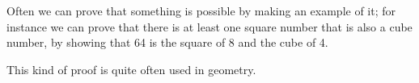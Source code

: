 Often we can prove that something is possible by making an example of it;
for instance we can prove that there is at least one square number that is 
also a cube number, by showing that 64 is the square of 8 and the cube of 4.
\par
This kind of proof is quite often used in geometry.